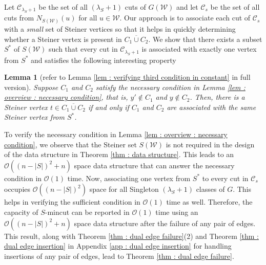 \documentclass[letterpaper,11pt]{article}
\newtheorem{lemma}{Lemma}[]
\begin{document}
Let ${\mathcal C}_{\lambda_S+1}$ be the set of all $(\lambda_S+1)$ cuts of $G({\mathcal W})$ and let  ${\mathcal C}_s$ be the set of all cuts from $N_{S({\mathcal W})}(u)$ for all $u\in {\mathcal W}$. Our approach is to associate each cut of ${\mathcal C}_s$ with a \textit{small} set of Steiner vertices so that it helps in quickly determining whether a Steiner vertex is present in $ \overline{C_1\cup C_2}$. We show that there exists a subset $S^*$ of $S({\mathcal W})$ such that every cut in ${\mathcal C}_{\lambda_S+1}$ is associated with exactly one vertex from $S^*$ and satisfies the following interesting property \begin{lemma}[refer to Lemma \ref{lem : verifying third condition in constant} in full version]\label{lem : labeling of cuts}
Suppose $C_1$ and $C_2$ satisfy the necessary condition in Lemma \ref{lem : overview : necessary condition}, that is, $y'\notin C_1$ and $y\notin C_2$. Then, there is a Steiner vertex $t\in \overline{C_1\cup C_2}$ if and only if $C_1$ and $C_2$ are associated with the same Steiner vertex from $S^*$.
\end{lemma}
To verify the necessary condition in Lemma \ref{lem : overview : necessary condition}, we observe that the Steiner set $S({\mathcal W})$ is not required in the design of the data structure in Theorem \ref{thm : data structure}. This leads to an ${\mathcal O}((n-|S|)^2+n)$ space data structure that can answer the necessary condition in ${\mathcal O}(1)$ time.
Now, associating one vertex from $S^*$ to every cut in ${\mathcal C}_s$ occupies ${\mathcal O}((n-|S|)^2)$ space for all Singleton $(\lambda_S+1)$ classes of $G$. This helps in verifying the sufficient condition in ${\mathcal O}(1)$ time as well. Therefore, the capacity of $S$-mincut can be reported in ${\mathcal O}(1)$ time using an ${\mathcal O}((n-|S|)^2+n)$ space data structure after the failure of any pair of edges. This result, along with Theorem \ref{thm : dual edge failure}(2) and Theorem \ref{thm : dual edge insertion} in Appendix \ref{app : dual edge insertion} for handling insertions of any pair of edges, lead to Theorem \ref{thm : dual edge failure}. 
\end{document}
